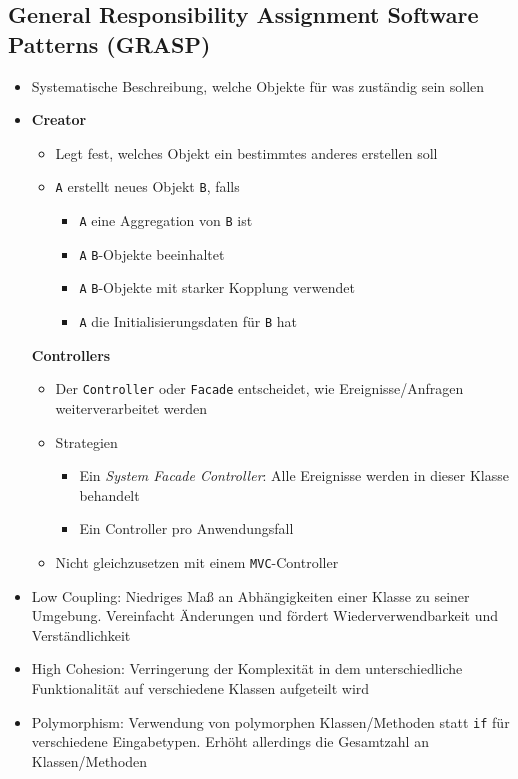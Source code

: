 \subsection{General Responsibility Assignment Software Patterns (GRASP)}
\begin{itemize}
	\item Systematische Beschreibung, welche Objekte für was zuständig sein sollen
	\item \textbf{Creator}
	\begin{itemize}
		\item Legt fest, welches Objekt ein bestimmtes anderes erstellen soll
		\item \texttt{A} erstellt neues Objekt \texttt{B}, falls
		\begin{itemize}
			\item \texttt{A} eine Aggregation von \texttt{B} ist
			\item \texttt{A} \texttt{B}-Objekte beeinhaltet
			\item \texttt{A} \texttt{B}-Objekte mit starker Kopplung verwendet
			\item \texttt{A} die Initialisierungsdaten für \texttt{B} hat
		\end{itemize}
	\end{itemize}
	\textbf{Controllers}
	\begin{itemize}
		\item Der \texttt{Controller} oder \texttt{Facade} entscheidet, wie Ereignisse/Anfragen weiterverarbeitet werden
		\item Strategien
		\begin{itemize}
			\item Ein \textit{System Facade Controller}: Alle Ereignisse werden in dieser Klasse behandelt
			\item Ein Controller pro Anwendungsfall
		\end{itemize}
		\item Nicht gleichzusetzen mit einem \texttt{MVC}-Controller
	\end{itemize}
	\item Low Coupling: Niedriges Maß an Abhängigkeiten einer Klasse zu seiner Umgebung. Vereinfacht Änderungen und fördert Wiederverwendbarkeit und Verständlichkeit
	\item High Cohesion: Verringerung der Komplexität in dem unterschiedliche Funktionalität auf verschiedene Klassen aufgeteilt wird
	\item Polymorphism: Verwendung von polymorphen Klassen/Methoden statt \texttt{if} für verschiedene Eingabetypen. Erhöht allerdings die Gesamtzahl an Klassen/Methoden

\end{itemize}
